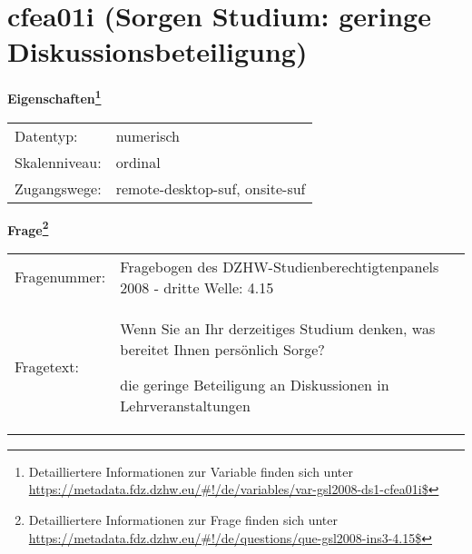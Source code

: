 
    \setcounter{footnote}{0}

    \vspace*{-1.8cm}
	\section{cfea01i (Sorgen Studium: geringe Diskussionsbeteiligung)}
	\label{section:cfea01i}



    \vspace*{0.5cm}
    \noindent\textbf{Eigenschaften\footnote{Detailliertere Informationen zur Variable finden sich unter
		\url{https://metadata.fdz.dzhw.eu/\#!/de/variables/var-gsl2008-ds1-cfea01i$}}}\\
	\begin{tabularx}{\hsize}{@{}lX}
	Datentyp: & numerisch \\
	Skalenniveau: & ordinal \\
	Zugangswege: &
	  remote-desktop-suf, 
	  onsite-suf
 \\
    \end{tabularx}



				\vspace*{0.5cm}
                \noindent\textbf{Frage\footnote{Detailliertere Informationen zur Frage finden sich unter
		              \url{https://metadata.fdz.dzhw.eu/\#!/de/questions/que-gsl2008-ins3-4.15$}}}\\
				\begin{tabularx}{\hsize}{@{}lX}
					Fragenummer: &
					  Fragebogen des DZHW-Studienberechtigtenpanels 2008 - dritte Welle:
					  4.15
 \\
					Fragetext: & Wenn Sie an Ihr derzeitiges Studium denken, was bereitet Ihnen persönlich Sorge?\par  die geringe Beteiligung an Diskussionen in Lehrveranstaltungen \\
				\end{tabularx}





